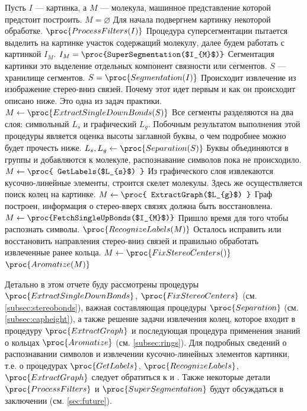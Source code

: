 \begin{codebox}
  \li \Comment Пусть $I$ --- картинка, а $M$ --- молекула, 
  \li машинное представление которой предстоит построить.
  \li $M = \varnothing $
  \li
  \li \Comment Для начала подвергнем картинку некоторой обработке.
  \li $\proc{ProcessFilters(I)}$
  \li
  \li \Comment Процедура суперсегментации пытается выделить на картинке 
  \li \Comment участок содержащий молекулу,
  \li \Comment далее будем работать с картинкой $I_{M}$.
  \li $ I_{M} = \proc{SuperSegmentation($I_{M}$)} $
  \li  
  \li \Comment Сегментация картинки это выделение отдельных компонент связности или сегментов. 
  \li \Comment $S$ --- хранилище сегментов.
  \li $ S = \proc{Segmentation(I)} $
  \li 
  \li \Comment Происходит извлечение из изображение стерео-вниз связей. Почему этот идет первым и
  \li \Comment как он происходит описано ниже. Это одна из задач практики.
  \li $ M \gets \proc{ExtractSingleDownBonds(S)} $
  \li
  \li \Comment Все сегменты разделяются на два слоя: символьный $L_{s}$ и графический $L_{g}$. 
  \li \Comment Побочным результатом выполнения этой процедуры является оценка высоты заглавной
  \li \Comment буквы, о чем подробнее можно будет прочесть ниже.
  \li $ L_{s}, L_{g} \gets \proc{Separation(S)} $
  \li 
  \li \Comment Буквы объединяются в группы и добавляются к молекуле, распознавание символов пока
  \li \Comment не происходило.
  \li $ M \gets \proc{ GetLabels($L_{s}$) } $
  \li
  \li \Comment Из графического слоя извлекаются кусочно-линейные элементы, строится скелет молекулы.
  \li \Comment Здесь же осуществляется поиск колец на картинке.
  \li $ M \gets \proc{ ExtractGraph($L_{g}$) } $
  \li
  \li \Comment Граф построен, информация о стерео-вверх связях должна быть восстановлена.
  \li $ M \gets \proc{FetchSingleUpBonds($I_{M}$)} $
  \li
  \li \Comment Пришло время для того чтобы распознать символы.
  \li $ \proc{RecognizeLabels(M)} $
  \li
  \li \Comment Осталось исправить или восстановить направления стерео-вниз связей и
  \li \Comment правильно обработать извлеченные ранее кольца.
  \li $ M \gets \proc{FixStereoCenters()} $
  \li $ \proc{Aromatize(M)} $
\end{codebox}

\noindent
Детально в этом отчете буду рассмотрены процедуры $\proc{ExtractSingleDownBonds}$, $\proc{FixStereoCenters}$ (см. \ref{subsec:stereobonds}), важная
составляющая процедуры $\proc{Separation}$ (см. \ref{subsec:capheight}), а также решение задачи извлечения колец, которое 
входит в процедуру $\proc{ExtractGraph}$ и последующая процедура применения знаний о кольцах $\proc{Aromatize}$ (см. \ref{subsec:rings}). Для 
подробных сведений о распознавании символов и извлечении кусочно-линейных элементов картинки, т.е. о процедурах $\proc{GetLabels}$, 
$\proc{RecognizeLabels}$, $\proc{ExtractGraph}$ следует обратиться к \cite{smolov} и \cite{zahn}. Также некоторые детали
$\proc{ProcessFilters}$ и $\proc{SuperSegmentation}$ будут обсуждаться в заключении (см. \ref{sec:future}). 

